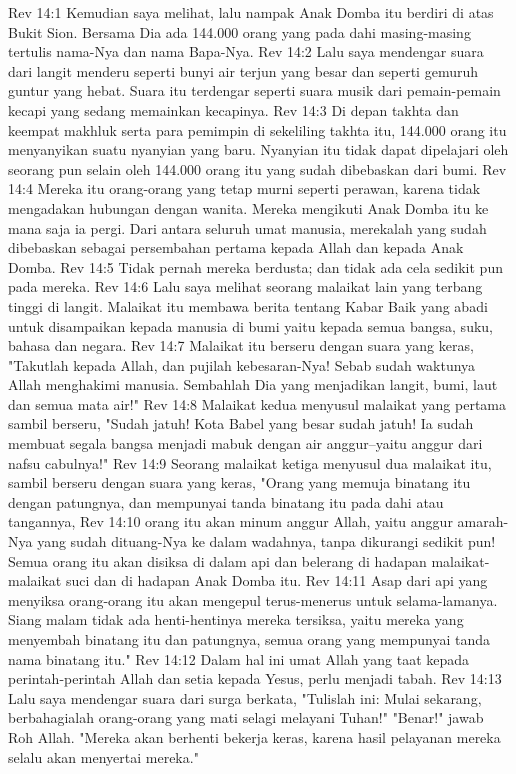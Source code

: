 Rev 14:1  Kemudian saya melihat, lalu nampak Anak Domba itu berdiri di atas Bukit Sion. Bersama Dia ada 144.000 orang yang pada dahi masing-masing tertulis nama-Nya dan nama Bapa-Nya.
Rev 14:2  Lalu saya mendengar suara dari langit menderu seperti bunyi air terjun yang besar dan seperti gemuruh guntur yang hebat. Suara itu terdengar seperti suara musik dari pemain-pemain kecapi yang sedang memainkan kecapinya.
Rev 14:3  Di depan takhta dan keempat makhluk serta para pemimpin di sekeliling takhta itu, 144.000 orang itu menyanyikan suatu nyanyian yang baru. Nyanyian itu tidak dapat dipelajari oleh seorang pun selain oleh 144.000 orang itu yang sudah dibebaskan dari bumi.
Rev 14:4  Mereka itu orang-orang yang tetap murni seperti perawan, karena tidak mengadakan hubungan dengan wanita. Mereka mengikuti Anak Domba itu ke mana saja ia pergi. Dari antara seluruh umat manusia, merekalah yang sudah dibebaskan sebagai persembahan pertama kepada Allah dan kepada Anak Domba.
Rev 14:5  Tidak pernah mereka berdusta; dan tidak ada cela sedikit pun pada mereka.
Rev 14:6  Lalu saya melihat seorang malaikat lain yang terbang tinggi di langit. Malaikat itu membawa berita tentang Kabar Baik yang abadi untuk disampaikan kepada manusia di bumi yaitu kepada semua bangsa, suku, bahasa dan negara.
Rev 14:7  Malaikat itu berseru dengan suara yang keras, "Takutlah kepada Allah, dan pujilah kebesaran-Nya! Sebab sudah waktunya Allah menghakimi manusia. Sembahlah Dia yang menjadikan langit, bumi, laut dan semua mata air!"
Rev 14:8  Malaikat kedua menyusul malaikat yang pertama sambil berseru, "Sudah jatuh! Kota Babel yang besar sudah jatuh! Ia sudah membuat segala bangsa menjadi mabuk dengan air anggur--yaitu anggur dari nafsu cabulnya!"
Rev 14:9  Seorang malaikat ketiga menyusul dua malaikat itu, sambil berseru dengan suara yang keras, "Orang yang memuja binatang itu dengan patungnya, dan mempunyai tanda binatang itu pada dahi atau tangannya,
Rev 14:10  orang itu akan minum anggur Allah, yaitu anggur amarah-Nya yang sudah dituang-Nya ke dalam wadahnya, tanpa dikurangi sedikit pun! Semua orang itu akan disiksa di dalam api dan belerang di hadapan malaikat-malaikat suci dan di hadapan Anak Domba itu.
Rev 14:11  Asap dari api yang menyiksa orang-orang itu akan mengepul terus-menerus untuk selama-lamanya. Siang malam tidak ada henti-hentinya mereka tersiksa, yaitu mereka yang menyembah binatang itu dan patungnya, semua orang yang mempunyai tanda nama binatang itu."
Rev 14:12  Dalam hal ini umat Allah yang taat kepada perintah-perintah Allah dan setia kepada Yesus, perlu menjadi tabah.
Rev 14:13  Lalu saya mendengar suara dari surga berkata, "Tulislah ini: Mulai sekarang, berbahagialah orang-orang yang mati selagi melayani Tuhan!" "Benar!" jawab Roh Allah. "Mereka akan berhenti bekerja keras, karena hasil pelayanan mereka selalu akan menyertai mereka."

